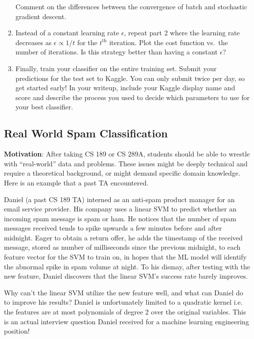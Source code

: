 \begin{enumerate}
  Comment on the differences between the convergence of batch and stochastic
  gradient descent.

\item Instead of a constant learning rate $\epsilon$, repeat part 2 where the
  learning rate decreases as $\epsilon \propto 1/t$ for the $t^\mathrm{th}$
  iteration. Plot the cost function vs.\ the number of iterations. Is this
  strategy better than having a constant $\epsilon$?

\item Finally, train your classifier on the entire training set. Submit your
  predictions for the test set to Kaggle. You can only submit twice per day, so
  get started early! In your writeup, include your Kaggle display name and
  score and describe the process you used to decide which parameters to use for
  your best classifier.

\end{enumerate}



\newpage


\subsection{Real World Spam Classification}


\textbf{Motivation}: After taking CS 189 or CS 289A, students should be able to wrestle with ``real-world'' data and problems. These issues might be deeply technical and require a theoretical background, or might demand specific domain knowledge. Here is an example that a past TA encountered.

Daniel (a past CS 189 TA) interned as an anti-spam product manager for an email service provider. His company uses a linear SVM to predict whether an incoming spam message is spam or ham. He notices that the number of spam messages received tends to spike upwards a few minutes before and after midnight. Eager to obtain a return offer, he adds the timestamp of the received message, stored as number of milliseconds since the previous midnight, to each feature vector for the SVM to train on, in hopes that the ML model will identify the abnormal spike in spam volume at night. To his dismay, after testing with the new feature, Daniel discovers that the linear SVM's success rate barely improves.

Why can't the linear SVM utilize the new feature well, and what can Daniel do to improve his results? Daniel is unfortunately limited to a quadratic kernel i.e. the features are at most polynomials of degree 2 over the original variables. This is an actual interview question Daniel received for a machine learning engineering position!

